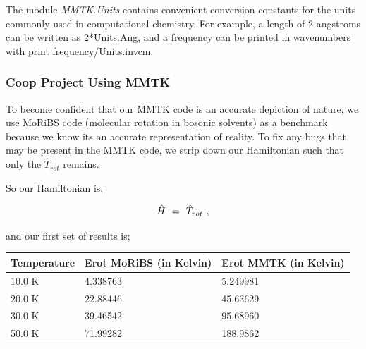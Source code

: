 \documentclass{article}
\newcounter{subsubsubsection}[subsubsection]
\begin{document}
The module \textit{MMTK.Units} contains convenient conversion
constants for the units commonly used in computational chemistry.  For
example, a length of 2 angstroms can be written as 2*Units.Ang, and a
frequency can be printed in wavenumbers with print frequency/Units.invcm. 

\subsubsection{Coop Project Using MMTK}

To become confident that our MMTK code is an accurate depiction of nature, we use MoRiBS code (molecular rotation in bosonic solvents) as a benchmark because we know its an accurate representation of reality. To fix any bugs that may be present in the MMTK code, we strip down our Hamiltonian such that only the \begin{math} \hat{T}_{rot} \end{math} remains. 


So our Hamiltonian is;

\begin{equation} \label{eq:3}
\hat{H} \hspace{0.125cm} = \hspace{0.125cm} \hat{T}_{rot} \hspace{0.125cm} ,
\end{equation}

and our first set of results is; \\

\begin{center}
\begin{tabular*}{\textwidth}{ | p{} | p{}| p{}|}
\hline
\textbf{Temperature} & \textbf{Erot MoRiBS} (in Kelvin) & \textbf{Erot MMTK} (in Kelvin) \\ 
\hline 
10.0 K & 4.338763 & 5.249981 \\ 
\hline
20.0 K & 22.88446 & 45.63629 \\
\hline 
30.0 K & 39.46542 & 95.68960 \\ 
\hline 
50.0 K & 71.99282 & 188.9862 \\
\hline 
\end{tabular*}
\end{center} 
\end{document}
